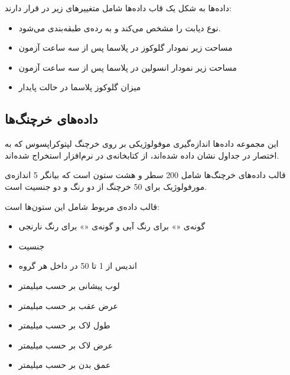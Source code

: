 داده‌ها به شکل یک قاب داده‌ها شامل متغییرهای زیر در 
قرار دارند:

\begin{itemize}
\item
{}
نوع دیابت را مشخص می‌کند و به رده‌ی 
طبقه‌بندی می‌شود.
\item
{}
مساحت زیر نمودار گلوکوز در پلاسما پس از سه ساعت آزمون 
\item
{}
مساحت زیر نمودار انسولین در پلاسما پس از سه ساعت آزمون
\item
{}
میزان گلوکوز پلاسما در حالت پایدار
\end{itemize}

\subsection{
داده‌های خرچنگ‌ها
}

این مجموعه داده‌ها اندازه‌گیری موفولوژیکی
بر روی خرچنگ لپتوکراپسوس  که به اختصار
در جداول نشان داده شده‌اند، از کتابخانه‌ی 
\cite{rMASS}
در نرم‌افزار 
استخراج شده‌اند.

قالب داده‌های خرچنگ‌ها شامل 200 سطر و هشت ستون است که بیانگر 5 اندازه‌ی مورفولوژیک برای 50 خرچنگ از دو رنگ و دو جنسیت است.

قالب داده‌ی مربوط شامل این ستون‌ها است:

\begin{itemize}
\item
{}
گونه‌ی «» برای رنگ آبی و گونه‌ی «» برای رنگ نارنجی
\item
{}
جنسیت
\item
{}
اندیس از 1 تا 50 در داخل هر گروه
\item
{}
لوب پیشانی بر حسب میلیمتر
\item
{}
عرض عقب بر حسب میلیمتر
\item
{}
طول لاک بر حسب میلیمتر
\item
{}
عرض لاک بر حسب میلیمتر
\item
{}
عمق بدن بر حسب میلیمتر
\end{itemize}


